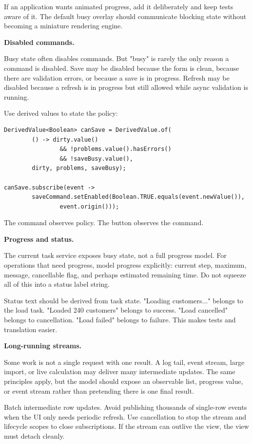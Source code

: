 If an application wants animated progress, add it deliberately and keep tests
aware of it. The default busy overlay should communicate blocking state without
becoming a miniature rendering engine.

\textbf{Disabled commands.}

Busy state often disables commands. But "busy" is rarely the only reason a
command is disabled. Save may be disabled because the form is clean, because
there are validation errors, or because a save is in progress. Refresh may be
disabled because a refresh is in progress but still allowed while async
validation is running.

Use derived values to state the policy:

\begin{lstlisting}[caption={Command enablement derived from busy and form state.}]
DerivedValue<Boolean> canSave = DerivedValue.of(
        () -> dirty.value()
                && !problems.value().hasErrors()
                && !saveBusy.value(),
        dirty, problems, saveBusy);

canSave.subscribe(event ->
        saveCommand.setEnabled(Boolean.TRUE.equals(event.newValue()),
                event.origin()));
\end{lstlisting}

The command observes policy. The button observes the command.

\textbf{Progress and status.}

The current task service exposes busy state, not a full progress model. For
operations that need progress, model progress explicitly: current step, maximum,
message, cancellable flag, and perhaps estimated remaining time. Do not squeeze
all of this into a status label string.

Status text should be derived from task state. "Loading customers..." belongs to
the load task. "Loaded 240 customers" belongs to success. "Load cancelled"
belongs to cancellation. "Load failed" belongs to failure. This makes tests and
translation easier.

\textbf{Long-running streams.}

Some work is not a single request with one result. A log tail, event stream,
large import, or live calculation may deliver many intermediate updates. The
same principles apply, but the model should expose an observable list, progress
value, or event stream rather than pretending there is one final result.

Batch intermediate row updates. Avoid publishing thousands of single-row events
when the UI only needs periodic refresh. Use cancellation to stop the stream and
lifecycle scopes to close subscriptions. If the stream can outlive the view,
the view must detach cleanly.

